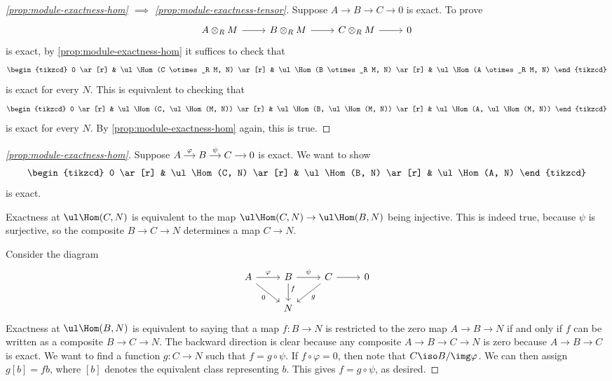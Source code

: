 \documentclass{standalone}
\begin{document}
\begin{proof}[\cref{prop:module-exactness-hom} \(\implies\)
  \cref{prop:module-exactness-tensor}]
  Suppose \(A \to B \to C \to 0\) is exact.
  To prove
  \[
    \begin{tikzcd}
      A \otimes_R M \ar[r] &
      B \otimes_R M \ar[r] &
      C \otimes_R M \ar[r] &
      0
    \end{tikzcd}
  \]
  is exact, by \cref{prop:module-exactness-hom} it suffices to check that
  \[
    \begin{tikzcd}
      0 \ar[r] &
      \ul\Hom(C \otimes_R M, N) \ar[r] &
      \ul\Hom(B \otimes_R M, N) \ar[r] &
      \ul\Hom(A \otimes_R M, N)
    \end{tikzcd}
  \]
  is exact for every \(N\).
  This is equivalent to checking that
  \[
    \begin{tikzcd}
      0 \ar[r] &
      \ul\Hom(C, \ul\Hom(M, N)) \ar[r] &
      \ul\Hom(B, \ul\Hom(M, N)) \ar[r] &
      \ul\Hom(A, \ul\Hom(M, N))
    \end{tikzcd}
  \]
  is exact for every \(N\).
  By \cref{prop:module-exactness-hom} again, this is true.
\end{proof}

\begin{proof}[\cref{prop:module-exactness-hom}]
  Suppose
  \(
    \begin{tikzcd}[cramped, column sep=small]
      A \ar[r, "\varphi"] & B \ar[r, "\psi"] & C \ar[r] & 0
    \end{tikzcd}
  \)
  is exact. We want to show
  \[
    \begin{tikzcd}
      0 \ar[r] &
      \ul\Hom(C, N) \ar[r] &
      \ul\Hom(B, N) \ar[r] &
      \ul\Hom(A, N)
    \end{tikzcd}
  \]
  is exact.

  Exactness at \(\ul\Hom(C, N)\) is equivalent to the map
  \(\ul\Hom(C, N) \to \ul\Hom(B, N)\) being injective.
  This is indeed true, because \(\psi\) is surjective,
  so the composite \(B \to C \to N\) determines a map \(C \to N\).

  Consider the diagram
  \[
    \begin{tikzcd}
      A \ar[r, "\varphi"] \ar[rd, "0"'] &
        B \ar[r, "\psi"] \ar[d, "f" pos=0.3] &
        C \ar[r] \ar[ld, "g"]&
        0 \\
      & N & &
    \end{tikzcd}
  \]
  Exactness at \(\ul\Hom(B, N)\) is equivalent to saying that a
  map \(f \colon B \to N\) is restricted to the zero map \(A \to B \to N\)
  if and only if \(f\) can be written as a composite \(B \to C \to N\).
  The backward direction is clear because any composite \(A \to B \to C \to N\)
  is zero because \(A \to B \to C\) is exact.
  We want to find a function \(g \colon C \to N\)
  such that \(f = g \circ \psi\).
  If \(f \circ \varphi = 0\), then note that \(C \iso B / \img \varphi\).
  We can then assign \(g [b] = f b\),
  where \([b]\) denotes the equivalent class representing \(b\).
  This gives \(f = g \circ \psi\), as desired.
\end{proof}
\end{document}
